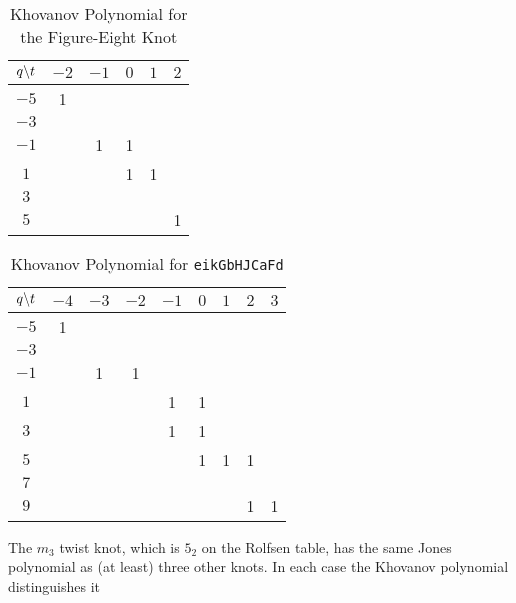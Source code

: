 \documentclass{article}
\theoremstyle{plain}
\begin{document}
        \begin{table}[H]
            \centering
            \begin{tabular}{| c | c | c | c | c | c |}
                \hline
                $q\symbol{92}t$&$-2$&$-1$&$0$&$1$&$2$\\
                \hline
                $-5$&1&&&&\\
                \hline
                $-3$&&&&&\\
                \hline
                $-1$&&1&1&&\\
                \hline
                $1$&&&1&1&\\
                \hline
                $3$&&&&&\\
                \hline
                $5$&&&&&1\\
                \hline
            \end{tabular}
            \caption{Khovanov Polynomial for the Figure-Eight Knot}
            \label{table:m_2_kho}
        \end{table}
        \begin{table}[H]
            \centering
            \begin{tabular}{| c | c | c | c | c | c | c | c | c |}
                \hline
                $q\symbol{92}t$&$-4$&$-3$&$-2$&$-1$&$0$&$1$&$2$&$3$\\
                \hline
                $-5$&1&&&&&&&\\
                \hline
                $-3$&&&&&&&&\\
                \hline
                $-1$&&1&1&&&&&\\
                \hline
                $1$&&&&1&1&&&\\
                \hline
                $3$&&&&1&1&&&\\
                \hline
                $5$&&&&&1&1&1&\\
                \hline
                $7$&&&&&&&&\\
                \hline
                $9$&&&&&&&1&1\\
                \hline
            \end{tabular}
            \caption{Khovanov Polynomial for \texttt{eikGbHJCaFd}}
            \label{table:eikGbHJCaFd_kho}
        \end{table}
        The $m_{3}$ twist knot, which is $5_{2}$ on the Rolfsen table,
        has the same Jones polynomial as (at least) three other knots. In each
        case the Khovanov polynomial distinguishes it
\end{document}
